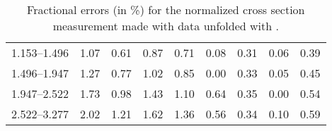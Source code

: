 \begin{table}
\begin{center}
\begin{tabular}{@{}l l l l l l l l l@{}}
            1.153--1.496    &  1.07   &  0.61   &  0.87         &  0.71      &  0.08    &  0.31  &  0.06       &  0.39  \\
            1.496--1.947    &  1.27   &  0.77   &  1.02         &  0.85      &  0.00    &  0.33  &  0.05       &  0.45  \\
            1.947--2.522    &  1.73   &  0.98   &  1.43         &  1.10      &  0.64    &  0.35  &  0.00       &  0.54  \\
            2.522--3.277    &  2.02   &  1.21   &  1.62         &  1.36      &  0.56    &  0.34  &  0.10       &  0.59  \\
            \bottomrule
        \end{tabular}
    \end{center}
    \caption{
        Fractional errors (in \%) for the normalized cross section measurement
        made with data unfolded with \MADGRAPH.
    }
    \label{tab:sys_uncert_norm}
\end{table}
